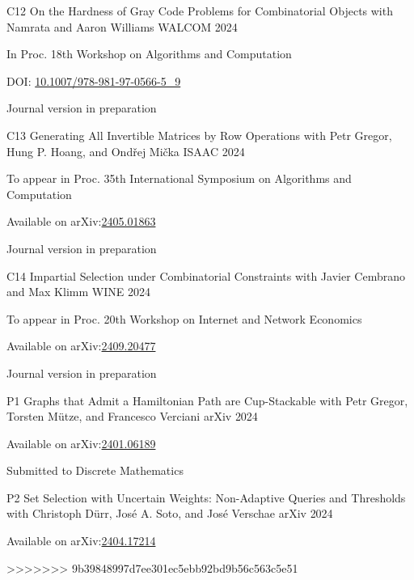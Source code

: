 \begin{cvpublication}
	{C12}
	{On the Hardness of Gray Code Problems for Combinatorial Objects}
	{with Namrata and Aaron Williams}
	{WALCOM}
	{2024}
    {
	\begin{cvitems}
	\item In Proc. 18th Workshop on Algorithms and Computation
	\item[] DOI: \href{https://doi.org/10.1007/978-981-97-0566-5_9}{10.1007/978-981-97-0566-5_9}
	\item Journal version in preparation
	\end{cvitems}
	}
\end{cvpublication}
\begin{cvpublication}
	{C13}
	{Generating All Invertible Matrices by Row Operations}
	{with Petr Gregor, Hung P. Hoang, and Ondřej Mička}
	{ISAAC}
	{2024}
    {
	\begin{cvitems}
	\item To appear in Proc. 35th International Symposium on Algorithms and Computation
	\item[] Available on arXiv:\href{https://arxiv.org/abs/2405.01863}{2405.01863}
	\item Journal version in preparation
	\end{cvitems}
	}
\end{cvpublication}
\begin{cvpublication}
	{C14}
	{Impartial Selection under Combinatorial Constraints}
	{with Javier Cembrano and Max Klimm}
	{WINE}
	{2024}
    {
	\begin{cvitems}
	\item To appear in Proc. 20th Workshop on Internet and Network Economics
	\item[] Available on arXiv:\href{https://arxiv.org/abs/2409.20477}{2409.20477}
	\item Journal version in preparation
	\end{cvitems}
	}
\end{cvpublication}
\begin{cvpublication}
	{P1}
	{Graphs that Admit a Hamiltonian Path are Cup-Stackable}
	{with Petr Gregor, Torsten Mütze, and Francesco Verciani}
	{arXiv}
    {2024}
	{
	\begin{cvitems}
		\item Available on arXiv:\href{https://arxiv.org/abs/2401.06189}{2401.06189}
		\item Submitted to Discrete Mathematics
	\end{cvitems}
	}
\end{cvpublication}
\begin{cvpublication}
	{P2}
	{Set Selection with Uncertain Weights: Non-Adaptive Queries and Thresholds}
	{with Christoph Dürr, José A. Soto, and José Verschae}
	{arXiv}
    {2024}
	{
	\begin{cvitems}
		\item Available on arXiv:\href{https://arxiv.org/abs/2404.17214}{2404.17214}
	\end{cvitems}
	}
\end{cvpublication}
>>>>>>> 9b39848997d7ee301ec5ebb92bd9b56c563c5e51
